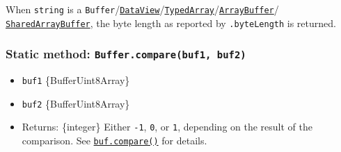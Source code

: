 \begin{Shaded}
\begin{Highlighting}[]
\NormalTok{ \{ }\NormalTok{ \} }\OperatorTok{=} \NormalTok{(}\NormalTok{)}\OperatorTok{;}

\OperatorTok{=} \StringTok{\textquotesingle{}}\StringTok{ + }\StringTok{ = }\StringTok{\textquotesingle{}}\OperatorTok{;}

\NormalTok{(}\VerbatimStringTok{\textasciigrave{}}\SpecialCharTok{$\{}\SpecialCharTok{\}}\VerbatimStringTok{: }\SpecialCharTok{$\{}\SpecialCharTok{\}} \OperatorTok{+}
            \VerbatimStringTok{\textasciigrave{}}\SpecialCharTok{$\{}\OperatorTok{,} \NormalTok{)}\SpecialCharTok{\}}\NormalTok{)}\OperatorTok{;}
\end{Highlighting}
\end{Shaded}

When \texttt{string} is a
\texttt{Buffer}/\href{https://developer.mozilla.org/en-US/docs/Web/JavaScript/Reference/Global_Objects/DataView}{\texttt{DataView}}/\href{https://developer.mozilla.org/en-US/docs/Web/JavaScript/Reference/Global_Objects/TypedArray}{\texttt{TypedArray}}/\href{https://developer.mozilla.org/en-US/docs/Web/JavaScript/Reference/Global_Objects/ArrayBuffer}{\texttt{ArrayBuffer}}/
\href{https://developer.mozilla.org/en-US/docs/Web/JavaScript/Reference/Global_Objects/SharedArrayBuffer}{\texttt{SharedArrayBuffer}},
the byte length as reported by \texttt{.byteLength} is returned.

\subsubsection{\texorpdfstring{Static method:
\texttt{Buffer.compare(buf1,\ buf2)}}{Static method: Buffer.compare(buf1, buf2)}}\label{static-method-buffer.comparebuf1-buf2}

\begin{itemize}
\tightlist
\item
  \texttt{buf1} \{Buffer\textbar Uint8Array\}
\item
  \texttt{buf2} \{Buffer\textbar Uint8Array\}
\item
  Returns: \{integer\} Either \texttt{-1}, \texttt{0}, or \texttt{1},
  depending on the result of the comparison. See
  \hyperref[bufcomparetarget-targetstart-targetend-sourcestart-sourceend]{\texttt{buf.compare()}}
  for details.
\end{itemize}

